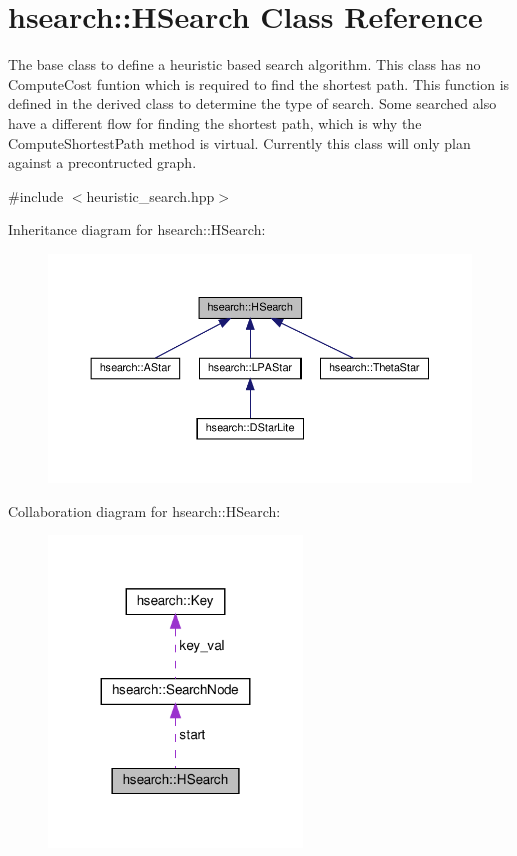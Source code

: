 \hypertarget{classhsearch_1_1HSearch}{}\section{hsearch\+:\+:H\+Search Class Reference}
\label{classhsearch_1_1HSearch}


The base class to define a heuristic based search algorithm. This class has no Compute\+Cost funtion which is required to find the shortest path. This function is defined in the derived class to determine the type of search. Some searched also have a different flow for finding the shortest path, which is why the Compute\+Shortest\+Path method is virtual. Currently this class will only plan against a precontructed graph.  




{\ttfamily \#include $<$heuristic\+\_\+search.\+hpp$>$}



Inheritance diagram for hsearch\+:\+:H\+Search\+:\nopagebreak
\begin{figure}[H]
\begin{center}
\leavevmode
\includegraphics[width=350pt]{d3/dff/classhsearch_1_1HSearch__inherit__graph}
\end{center}
\end{figure}


Collaboration diagram for hsearch\+:\+:H\+Search\+:\nopagebreak
\begin{figure}[H]
\begin{center}
\leavevmode
\includegraphics[width=191pt]{df/d1e/classhsearch_1_1HSearch__coll__graph}
\end{center}
\end{figure}
